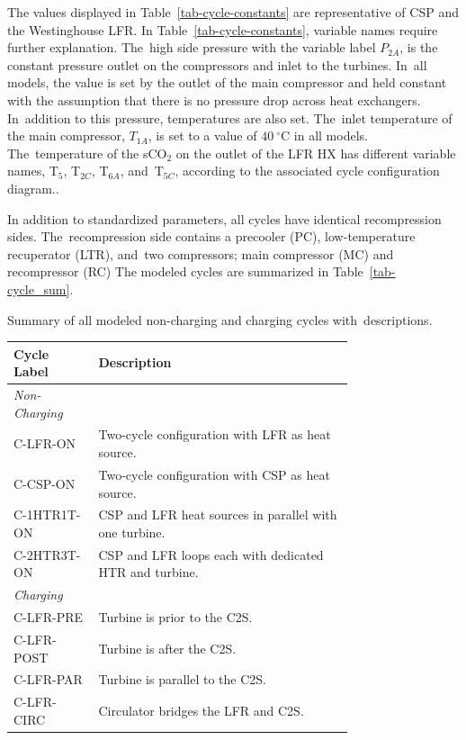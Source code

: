 \documentclass[sustainability,article,accept,moreauthors,pdftex]{Definitions/mdpi}
\begin{document}
\begin{paracol}{2}
The values displayed in Table~\ref{tab-cycle-constants} are representative of CSP and the Westinghouse LFR. 
{In Table~\ref{tab-cycle-constants}, variable names require further explanation. The~high side pressure with the variable label $P_{2A}$, is the constant pressure outlet on the compressors and inlet to the turbines. In~all models, the value is set by the outlet of the main compressor and held constant with the assumption that there is no pressure drop across heat exchangers. In~addition to this pressure, temperatures are also set. The~inlet temperature of the main compressor, $T_{1A}$, is set to a value of $40~^{\circ}$C in all models. The~temperature of the sCO$_2$ on the outlet of the LFR HX has different variable names, T$_5$, T$_{2C}$, T$_{6A}$, and~T$_{5C}$, according to the associated cycle configuration diagram.}{}.


In addition to standardized parameters, all cycles have identical recompression sides. The~recompression side contains a  %
{precooler (PC), low-temperature recuperator (LTR), and~two compressors; main compressor (MC) and recompressor (RC)}
The modeled cycles are summarized in Table~\ref{tab-cycle_sum}.

\begin{specialtable}[H] 
    \caption{Summary of all modeled non-charging and charging cycles with~descriptions. \label{tab-cycle_sum}}
    \begin{tabular}{lL{0.75\linewidth}}
    \toprule
    \textbf{Cycle Label} & \textbf{Description}\\
    \midrule
    \textit{Non-Charging}\\
    C-LFR-ON & Two-cycle configuration with LFR as heat source.\\
    C-CSP-ON & Two-cycle configuration with CSP as heat source.\\
    C-1HTR1T-ON & CSP and LFR heat sources in parallel with one turbine.\\
    C-2HTR3T-ON & CSP and LFR loops each with dedicated HTR and turbine.\\
    \midrule
    \textit{Charging}\\
    C-LFR-PRE & Turbine is prior to the C2S.\\
    C-LFR-POST & Turbine is after the C2S.\\
    C-LFR-PAR & Turbine is parallel to the C2S.\\
    C-LFR-CIRC & Circulator bridges the LFR and C2S.\\
    \bottomrule
    \end{tabular}
\end{specialtable}


\end{paracol}
\end{document}
